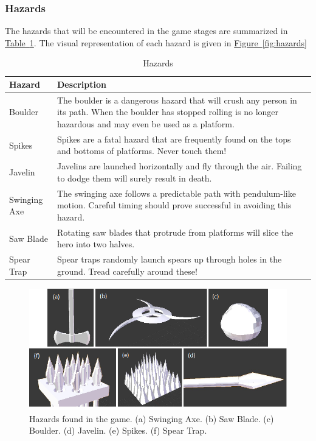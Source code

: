 \documentclass[12pt, titlepage]{article}
\begin{document}
\subsubsection{Hazards}
The hazards that will be encountered in the game stages are summarized in \hyperref[tab:hazards]{Table~\ref*{tab:hazards}}.  The visual representation of each hazard is given in \hyperref[fig:hazards]{Figure~\ref*{fig:hazards}}

\begin{table}[H]
\caption{Hazards} \label{tab:hazards}
\renewcommand{\arraystretch}{1.2}
\begin{tabularx}{\textwidth}{p{4cm}X}
\toprule {\bf Hazard} & {\bf Description}\\
\midrule
Boulder & The boulder is a dangerous hazard that will crush any person in its path.  When the boulder has stopped rolling is no longer hazardous and may even be used as a platform.\\
Spikes & Spikes are a fatal hazard that are frequently found on the tops and bottoms of platforms.  Never touch them! \\
Javelin & Javelins are launched horizontally and fly through the air.  Failing to dodge them will surely result in death. \\
Swinging Axe & The swinging axe follows a predictable path with pendulum-like motion.  Careful timing should prove successful in avoiding this hazard. \\
Saw Blade & Rotating saw blades that protrude from platforms will slice the hero into two halves. \\
Spear Trap & Spear traps randomly launch spears up through holes in the ground.  Tread carefully around these!\\
\bottomrule
\end{tabularx}
\end{table}

\begin{figure}[H]
\begin{center}
\includegraphics[width=\textwidth]{hazards}
\caption[Hazards found in the game.]{Hazards found in the game.  (a) Swinging Axe.  (b) Saw Blade.  (c) Boulder.  (d) Javelin.  (e) Spikes.  (f) Spear Trap.} \label{fig:arch}
\end{center}
\end{figure}
\end{document}
